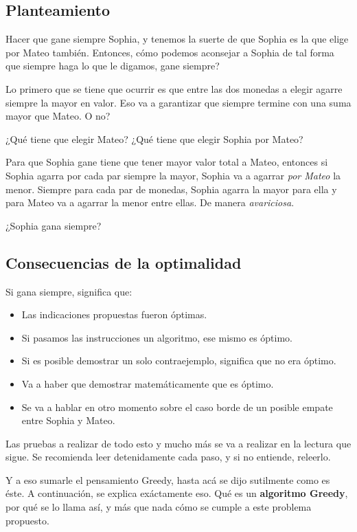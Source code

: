 \subsection{Planteamiento}

Hacer que gane siempre Sophia, y tenemos la suerte de que Sophia es la que elige por Mateo también. Entonces, cómo podemos aconsejar a Sophia de tal forma que siempre haga lo que le digamos, gane siempre?

Lo primero que se tiene que ocurrir es que entre las dos monedas a elegir agarre siempre la mayor en valor. Eso va a garantizar que siempre termine con una suma mayor que Mateo. O no?

¿Qué tiene que elegir Mateo? ¿Qué tiene que elegir Sophia por Mateo?

Para que Sophia gane tiene que tener mayor valor total a Mateo, entonces si Sophia agarra por cada par siempre la mayor, Sophia va a agarrar \textit{por Mateo} la menor. Siempre para cada par de monedas, Sophia agarra la mayor para ella y para Mateo va a agarrar la menor entre ellas.
De manera \textit{avariciosa}.

¿Sophia gana siempre?

\subsection{Consecuencias de la optimalidad}

Si gana siempre, significa que:

\begin{itemize}
    \item Las indicaciones propuestas fueron óptimas.
    \item Si pasamos las instrucciones un algoritmo, ese mismo es óptimo.
    \item Si es posible demostrar un solo contraejemplo, significa que no era óptimo.
    \item Va a haber que demostrar matemáticamente que es óptimo.
    \item Se va a hablar en otro momento sobre el caso borde de un posible empate entre Sophia y Mateo.
\end{itemize}


Las pruebas a realizar de todo esto y mucho más se va a realizar en la lectura que sigue. Se recomienda leer detenidamente cada paso, y si no entiende, releerlo. 

Y a eso sumarle el pensamiento Greedy, hasta acá se dijo sutilmente como es éste. A continuación, se explica exáctamente eso. Qué es un \textbf{algoritmo Greedy}, por qué se lo llama así, y más que nada cómo se cumple a este problema propuesto.


